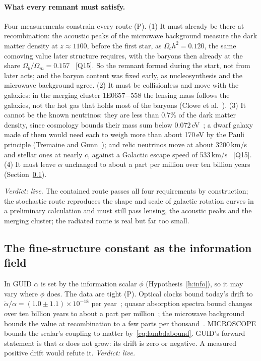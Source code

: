 \documentclass[11pt,a4paper]{article}
\theoremstyle{definition}
\theoremstyle{remark}
\newcommand{\chk}[1]{\textsf{[#1]}}
\newcommand{\tagP}{\textsf{(P)}}
\theoremstyle{definition}
\begin{document}
\paragraph{What every remnant must satisfy.} Four measurements constrain every route \tagP. (1) It must already be there at recombination:
the acoustic peaks of the microwave background measure the dark matter density at $z\approx1100$, before the first star, as
$\Omega_ch^2=0.120$, the same comoving value later structure requires, with the baryons then already at the share
$\Omega_b/\Omega_m=0.157$~\cite{planck18} \chk{Q15}. So the remnant formed during the start, not from later acts; and the baryon content
was fixed early, as nucleosynthesis and the microwave background agree. (2) It must be collisionless and move with the galaxies: in the
merging cluster 1E0657$-$558 the lensing mass follows the galaxies, not the hot gas that holds most of the baryons (Clowe et
al.~\cite{clowe}). (3) It cannot be the known neutrinos: they are less than $0.7\%$ of the dark matter density, since cosmology bounds
their mass sum below $0.072$\,eV~\cite{desi}; a dwarf galaxy made of them would need each to weigh more than about 170\,eV by the Pauli
principle (Tremaine and Gunn~\cite{tremainegunn}); and relic neutrinos move at about 3200\,km/s and stellar ones at nearly $c$, against a
Galactic escape speed of 533\,km/s~\cite{piffl} \chk{Q15}. (4) It must leave $\alpha$ unchanged to about a part per million over ten
billion years (Section~\ref{sec:alpha}).

\emph{Verdict: live.} The contained route passes all four requirements by construction; the stochastic route reproduces the shape and
scale of galactic rotation curves in a preliminary calculation and must still pass lensing, the acoustic peaks and the merging cluster;
the radiated route is real but far too small.

\subsection{The fine-structure constant as the information field}\label{sec:alpha}

In GUID $\alpha$ is set by the information scalar $\phi$ (Hypothesis~\ref{h:info}), so it may vary where $\phi$ does. The data are
tight \tagP. Optical clocks bound today's drift to $\dot\alpha/\alpha=(1.0\pm1.1)\times10^{-18}$ per year~\cite{lange}; quasar absorption
spectra bound changes over ten billion years to about a part per million~\cite{espresso}; the microwave background bounds the value at
recombination to a few parts per thousand~\cite{planckxxiv}. MICROSCOPE bounds the scalar's coupling to matter by~\eqref{eq:lambdabound}.
GUID's forward statement is that $\alpha$ does not grow: its drift is zero or negative. A measured positive drift would refute it.
\emph{Verdict: live.} 
\end{document}
